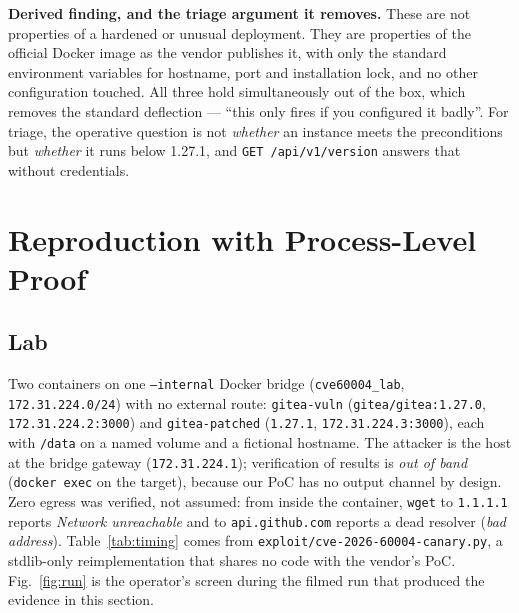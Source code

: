 \documentclass[journal]{IEEEtran}
\begin{document}
\textbf{Derived finding, and the triage argument it removes.} These are not
properties of a hardened or unusual deployment. They are properties of the
official Docker image as the vendor publishes it, with only the standard
environment variables for hostname, port and installation lock, and no other
configuration touched. All three hold simultaneously out of the box, which
removes the standard deflection --- ``this only fires if you configured it
badly''. For triage, the operative question is not \emph{whether} an instance
meets the preconditions but \emph{whether} it runs below 1.27.1, and
\texttt{GET /api/v1/version} answers that without credentials.

\section{Reproduction with Process-Level Proof}
\label{sec:repro}

\subsection{Lab}

Two containers on one \texttt{--internal} Docker bridge
(\texttt{cve60004\_lab}, \texttt{172.31.224.0/24}) with no external route:
\texttt{gitea-vuln} (\texttt{gitea/gitea:1.27.0},
\texttt{172.31.224.2:3000}) and \texttt{gitea-patched} (\texttt{1.27.1},
\texttt{172.31.224.3:3000}), each with \texttt{/data} on a named volume and a
fictional hostname. The attacker is the host at the bridge gateway
(\texttt{172.31.224.1}); verification of results is \emph{out of band}
(\texttt{docker exec} on the target), because our PoC has no output channel by
design. Zero egress was verified, not assumed: from inside the container,
\texttt{wget} to \texttt{1.1.1.1} reports \emph{Network unreachable} and to
\texttt{api.github.com} reports a dead resolver (\emph{bad address}).
Table~\ref{tab:timing} comes from \texttt{exploit/cve-2026-60004-canary.py}, a
stdlib-only reimplementation that shares no code with the vendor's PoC.
Fig.~\ref{fig:run} is the operator's screen during the filmed run that produced the
evidence in this section.
\end{document}
